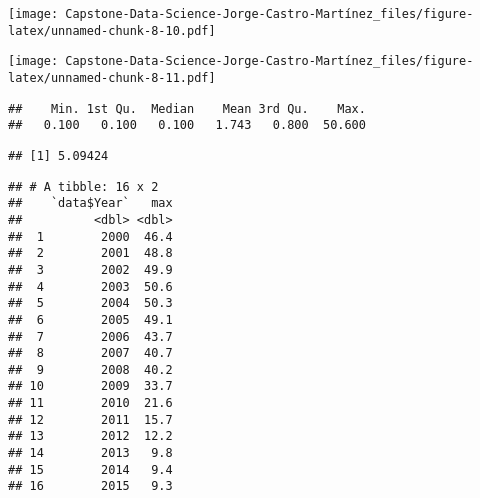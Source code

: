 \documentclass[
]{article}
\newenvironment{Shaded}{\begin{snugshade}}{\end{snugshade}}
\newcommand{\AttributeTok}[1]{\textcolor[rgb]{0.13,0.29,0.53}{#1}}
\newcommand{\ConstantTok}[1]{\textcolor[rgb]{0.56,0.35,0.01}{#1}}
\newcommand{\FunctionTok}[1]{\textcolor[rgb]{0.13,0.29,0.53}{\textbf{#1}}}
\newcommand{\NormalTok}[1]{#1}
\newcommand{\SpecialCharTok}[1]{\textcolor[rgb]{0.81,0.36,0.00}{\textbf{#1}}}
\begin{document}
\texttt{[image: Capstone-Data-Science-Jorge-Castro-Martínez\_files/figure-latex/unnamed-chunk-8-10.pdf]}

\begin{Shaded}
\end{Shaded}

\texttt{[image: Capstone-Data-Science-Jorge-Castro-Martínez\_files/figure-latex/unnamed-chunk-8-11.pdf]}

\begin{Shaded}
\end{Shaded}

\begin{verbatim}
##    Min. 1st Qu.  Median    Mean 3rd Qu.    Max. 
##   0.100   0.100   0.100   1.743   0.800  50.600
\end{verbatim}

\begin{Shaded}
\end{Shaded}

\begin{verbatim}
## [1] 5.09424
\end{verbatim}

\begin{Shaded}
\end{Shaded}

\begin{verbatim}
## # A tibble: 16 x 2
##    `data$Year`   max
##          <dbl> <dbl>
##  1        2000  46.4
##  2        2001  48.8
##  3        2002  49.9
##  4        2003  50.6
##  5        2004  50.3
##  6        2005  49.1
##  7        2006  43.7
##  8        2007  40.7
##  9        2008  40.2
## 10        2009  33.7
## 11        2010  21.6
## 12        2011  15.7
## 13        2012  12.2
## 14        2013   9.8
## 15        2014   9.4
## 16        2015   9.3
\end{verbatim}
\end{document}
